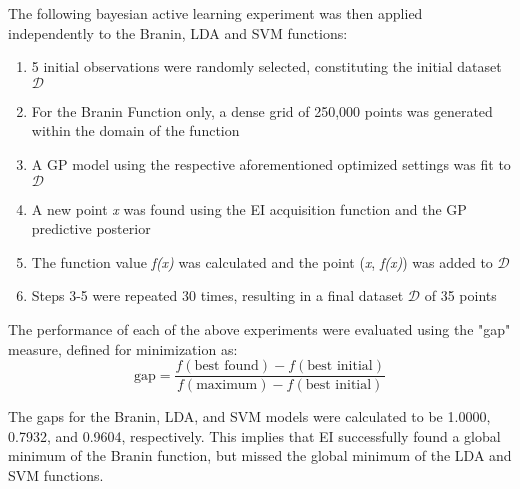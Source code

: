 \documentclass[11pt]{article}
\numberwithin{equation}{section}
\begin{document}
The following bayesian active learning experiment was then applied independently to the Branin, LDA and SVM functions:
\begin{enumerate}
  \item 5 initial observations were randomly selected, constituting the initial dataset $\mathcal{D}$
  \item For the Branin Function only, a dense grid of 250,000 points was generated within the domain of the function
  \item A GP model using the respective aforementioned optimized settings was fit to $\mathcal{D}$
  \item A new point \emph{x} was found using the EI acquisition function and the GP predictive posterior
  \item The function value \emph{f(x)} was calculated and the point (\emph{x}, \emph{f(x)}) was added to $\mathcal{D}$
  \item Steps 3-5 were repeated 30 times, resulting in a final dataset $\mathcal{D}$ of 35 points
\end{enumerate}

The performance of each of the above experiments were evaluated using the "gap" measure, defined for minimization as:
\begin{equation}
  \text{gap} = \dfrac{f(\text{best found}) - f(\text{best initial})}{f(\text{maximum}) - f(\text{best initial})}
  \label{eq:gap}
\end{equation}

The gaps for the Branin, LDA, and SVM models were calculated to be 1.0000, 0.7932, and 0.9604, respectively. 
This implies that EI successfully found a global minimum of the Branin function, but missed the global minimum of the LDA and SVM functions.
\end{document}
